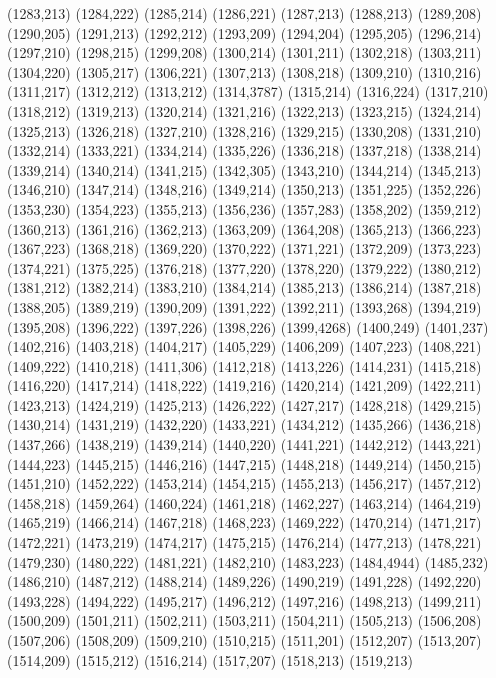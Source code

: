 (1283,213)
(1284,222)
(1285,214)
(1286,221)
(1287,213)
(1288,213)
(1289,208)
(1290,205)
(1291,213)
(1292,212)
(1293,209)
(1294,204)
(1295,205)
(1296,214)
(1297,210)
(1298,215)
(1299,208)
(1300,214)
(1301,211)
(1302,218)
(1303,211)
(1304,220)
(1305,217)
(1306,221)
(1307,213)
(1308,218)
(1309,210)
(1310,216)
(1311,217)
(1312,212)
(1313,212)
(1314,3787)
(1315,214)
(1316,224)
(1317,210)
(1318,212)
(1319,213)
(1320,214)
(1321,216)
(1322,213)
(1323,215)
(1324,214)
(1325,213)
(1326,218)
(1327,210)
(1328,216)
(1329,215)
(1330,208)
(1331,210)
(1332,214)
(1333,221)
(1334,214)
(1335,226)
(1336,218)
(1337,218)
(1338,214)
(1339,214)
(1340,214)
(1341,215)
(1342,305)
(1343,210)
(1344,214)
(1345,213)
(1346,210)
(1347,214)
(1348,216)
(1349,214)
(1350,213)
(1351,225)
(1352,226)
(1353,230)
(1354,223)
(1355,213)
(1356,236)
(1357,283)
(1358,202)
(1359,212)
(1360,213)
(1361,216)
(1362,213)
(1363,209)
(1364,208)
(1365,213)
(1366,223)
(1367,223)
(1368,218)
(1369,220)
(1370,222)
(1371,221)
(1372,209)
(1373,223)
(1374,221)
(1375,225)
(1376,218)
(1377,220)
(1378,220)
(1379,222)
(1380,212)
(1381,212)
(1382,214)
(1383,210)
(1384,214)
(1385,213)
(1386,214)
(1387,218)
(1388,205)
(1389,219)
(1390,209)
(1391,222)
(1392,211)
(1393,268)
(1394,219)
(1395,208)
(1396,222)
(1397,226)
(1398,226)
(1399,4268)
(1400,249)
(1401,237)
(1402,216)
(1403,218)
(1404,217)
(1405,229)
(1406,209)
(1407,223)
(1408,221)
(1409,222)
(1410,218)
(1411,306)
(1412,218)
(1413,226)
(1414,231)
(1415,218)
(1416,220)
(1417,214)
(1418,222)
(1419,216)
(1420,214)
(1421,209)
(1422,211)
(1423,213)
(1424,219)
(1425,213)
(1426,222)
(1427,217)
(1428,218)
(1429,215)
(1430,214)
(1431,219)
(1432,220)
(1433,221)
(1434,212)
(1435,266)
(1436,218)
(1437,266)
(1438,219)
(1439,214)
(1440,220)
(1441,221)
(1442,212)
(1443,221)
(1444,223)
(1445,215)
(1446,216)
(1447,215)
(1448,218)
(1449,214)
(1450,215)
(1451,210)
(1452,222)
(1453,214)
(1454,215)
(1455,213)
(1456,217)
(1457,212)
(1458,218)
(1459,264)
(1460,224)
(1461,218)
(1462,227)
(1463,214)
(1464,219)
(1465,219)
(1466,214)
(1467,218)
(1468,223)
(1469,222)
(1470,214)
(1471,217)
(1472,221)
(1473,219)
(1474,217)
(1475,215)
(1476,214)
(1477,213)
(1478,221)
(1479,230)
(1480,222)
(1481,221)
(1482,210)
(1483,223)
(1484,4944)
(1485,232)
(1486,210)
(1487,212)
(1488,214)
(1489,226)
(1490,219)
(1491,228)
(1492,220)
(1493,228)
(1494,222)
(1495,217)
(1496,212)
(1497,216)
(1498,213)
(1499,211)
(1500,209)
(1501,211)
(1502,211)
(1503,211)
(1504,211)
(1505,213)
(1506,208)
(1507,206)
(1508,209)
(1509,210)
(1510,215)
(1511,201)
(1512,207)
(1513,207)
(1514,209)
(1515,212)
(1516,214)
(1517,207)
(1518,213)
(1519,213)
